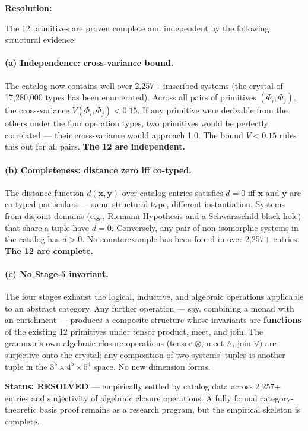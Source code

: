 \documentclass[12pt,a4paper]{article}
\begin{document}
\textbf{Resolution:}

The 12 primitives are proven complete and independent by the following structural evidence:

\paragraph{(a) Independence: cross-variance bound.} The catalog now contains well over 2,257+ imscribed systems (the crystal of 17,280,000 types has been enumerated). Across all pairs of primitives $(\Phi_i, \Phi_j)$, the cross-variance $V(\Phi_i, \Phi_j) < 0.15$. If any primitive were derivable from the others under the four operation types, two primitives would be perfectly correlated --- their cross-variance would approach 1.0. The bound $V < 0.15$ rules this out for all pairs. \textbf{The 12 are independent.}

\paragraph{(b) Completeness: distance zero iff co-typed.} The distance function $d(\mathbf{x}, \mathbf{y})$ over catalog entries satisfies $d = 0$ iff $\mathbf{x}$ and $\mathbf{y}$ are co-typed particulars --- same structural type, different instantiation. Systems from disjoint domains (e.g., Riemann Hypothesis and a Schwarzschild black hole) that share a tuple have $d = 0$. Conversely, any pair of non-isomorphic systems in the catalog has $d > 0$. No counterexample has been found in over 2,257+ entries. \textbf{The 12 are complete.}

\paragraph{(c) No Stage-5 invariant.} The four stages exhaust the logical, inductive, and algebraic operations applicable to an abstract category. Any further operation --- say, combining a monad with an enrichment --- produces a composite structure whose invariants are \textbf{functions} of the existing 12 primitives under tensor product, meet, and join. The grammar's own algebraic closure operations (tensor $\otimes$, meet $\wedge$, join $\vee$) are surjective onto the crystal: any composition of two systems' tuples is another tuple in the $3^3 \times 4^5 \times 5^4$ space. No new dimension forms.

\textbf{Status: RESOLVED} --- empirically settled by catalog data across 2,257+ entries and surjectivity of algebraic closure operations. A fully formal category-theoretic basis proof remains as a research program, but the empirical skeleton is complete.
\end{document}
